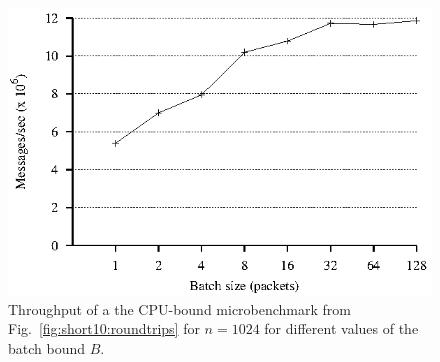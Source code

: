 \begin{figure}
\begin{centering}
\includegraphics{figs/batch.eps}
\caption{Throughput of a the CPU-bound microbenchmark from Fig.~\ref{fig:short10:roundtrips} for $n=1024$ for different values of the batch bound $B$.}
\label{fig:batch}
\end{centering}
\end{figure}

